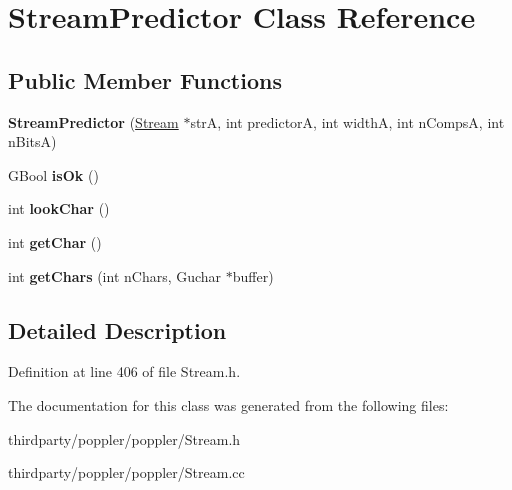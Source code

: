 \hypertarget{class_stream_predictor}{}\section{Stream\+Predictor Class Reference}
\label{class_stream_predictor}
\subsection*{Public Member Functions}
\begin{DoxyCompactItemize}
\item 
\mbox{\label{class_stream_predictor_a2592949a3b81ab4e6006e11f7a60a8e3}} 
{\bfseries Stream\+Predictor} (\hyperlink{class_stream}{Stream} $\ast$strA, int predictorA, int widthA, int n\+CompsA, int n\+BitsA)
\item 
\mbox{\label{class_stream_predictor_a2ddfb56db509d525ecfc37cb9e8ea583}} 
G\+Bool {\bfseries is\+Ok} ()
\item 
\mbox{\label{class_stream_predictor_a61f24c8239e9b07ecaa2ee71a9f86879}} 
int {\bfseries look\+Char} ()
\item 
\mbox{\label{class_stream_predictor_a1d2c83f6433c3b533a6738086427b7df}} 
int {\bfseries get\+Char} ()
\item 
\mbox{\label{class_stream_predictor_a9a036bf9cea6b27de3079ae766aadc6b}} 
int {\bfseries get\+Chars} (int n\+Chars, Guchar $\ast$buffer)
\end{DoxyCompactItemize}


\subsection{Detailed Description}


Definition at line 406 of file Stream.\+h.



The documentation for this class was generated from the following files\+:\begin{DoxyCompactItemize}
\item 
thirdparty/poppler/poppler/Stream.\+h\item 
thirdparty/poppler/poppler/Stream.\+cc\end{DoxyCompactItemize}
